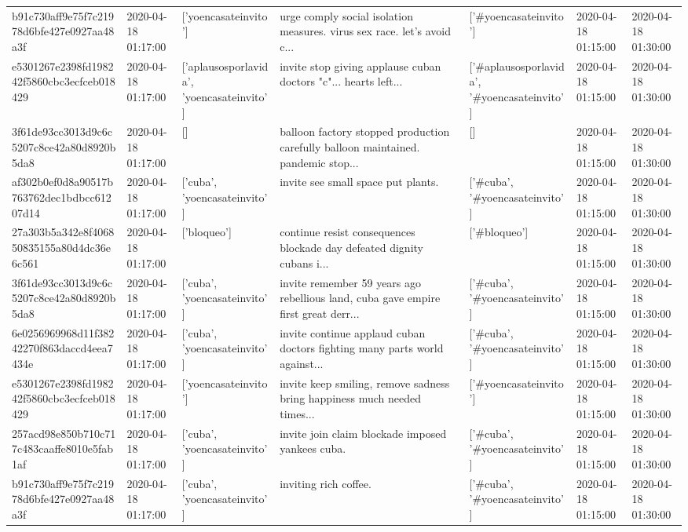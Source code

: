 \begin{tabular}{lllllll}
b91c730aff9e75f7c21978d6bfe427e0927aa48a3f & 2020-04-18 01:17:00 & ['yoencasateinvito'] & urge comply social isolation measures. virus sex race. let's avoid c... & ['#yoencasateinvito'] & 2020-04-18 01:15:00 & 2020-04-18 01:30:00 \\
e5301267e2398fd198242f5860cbc3ecfceb018429 & 2020-04-18 01:17:00 & ['aplausosporlavida', 'yoencasateinvito'] & invite stop giving applause cuban doctors "c"... hearts left... & ['#aplausosporlavida', '#yoencasateinvito'] & 2020-04-18 01:15:00 & 2020-04-18 01:30:00 \\
3f61de93cc3013d9c6c5207c8ce42a80d8920b5da8 & 2020-04-18 01:17:00 & [] & balloon factory stopped production carefully balloon maintained. pandemic stop... & [] & 2020-04-18 01:15:00 & 2020-04-18 01:30:00 \\
af302b0ef0d8a90517b763762dec1bdbcc61207d14 & 2020-04-18 01:17:00 & ['cuba', 'yoencasateinvito'] & invite see small space put plants. & ['#cuba', '#yoencasateinvito'] & 2020-04-18 01:15:00 & 2020-04-18 01:30:00 \\
27a303b5a342e8f406850835155a80d4dc36e6c561 & 2020-04-18 01:17:00 & ['bloqueo'] & continue resist consequences blockade day defeated dignity cubans i... & ['#bloqueo'] & 2020-04-18 01:15:00 & 2020-04-18 01:30:00 \\
3f61de93cc3013d9c6c5207c8ce42a80d8920b5da8 & 2020-04-18 01:17:00 & ['cuba', 'yoencasateinvito'] & invite remember 59 years ago rebellious land, cuba gave empire first great derr... & ['#cuba', '#yoencasateinvito'] & 2020-04-18 01:15:00 & 2020-04-18 01:30:00 \\
6e0256969968d11f38242270f863daccd4eea7434e & 2020-04-18 01:17:00 & ['cuba', 'yoencasateinvito'] & invite continue applaud cuban doctors fighting many parts world against... & ['#cuba', '#yoencasateinvito'] & 2020-04-18 01:15:00 & 2020-04-18 01:30:00 \\
e5301267e2398fd198242f5860cbc3ecfceb018429 & 2020-04-18 01:17:00 & ['yoencasateinvito'] & invite keep smiling, remove sadness bring happiness much needed times... & ['#yoencasateinvito'] & 2020-04-18 01:15:00 & 2020-04-18 01:30:00 \\
257acd98e850b710c717c483caaffe8010e5fab1af & 2020-04-18 01:17:00 & ['cuba', 'yoencasateinvito'] & invite join claim blockade imposed yankees cuba. & ['#cuba', '#yoencasateinvito'] & 2020-04-18 01:15:00 & 2020-04-18 01:30:00 \\
b91c730aff9e75f7c21978d6bfe427e0927aa48a3f & 2020-04-18 01:17:00 & ['cuba', 'yoencasateinvito'] & inviting rich coffee. & ['#cuba', '#yoencasateinvito'] & 2020-04-18 01:15:00 & 2020-04-18 01:30:00 \\

\end{tabular}
